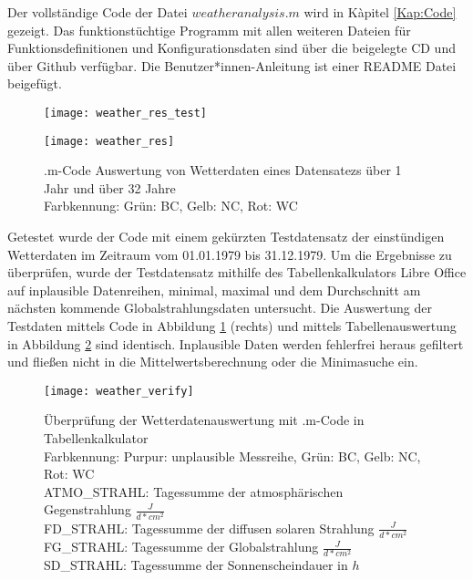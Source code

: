 Der vollständige Code der Datei $weatheranalysis.m$ wird in Kàpitel \ref{Kap:Code} gezeigt. Das funktionstüchtige Programm mit allen weiteren Dateien für Funktionsdefinitionen und Konfigurationsdaten sind über die beigelegte CD und über Github verfügbar. \cite{github_energyflowsim} Die Benutzer*innen-Anleitung ist einer README Datei beigefügt. \\

			\begin{figure}[h]
				\begin{minipage}{0.49\textwidth}
					\centering
					\texttt{[image: weather\_res\_test]}
				\end{minipage}\hfill
				\begin{minipage}{0.49\textwidth}
					\centering
					\texttt{[image: weather\_res]}
				\end{minipage}
				\caption{.m-Code Auswertung von Wetterdaten eines Datensatezs über 1 Jahr und über 32 Jahre \\ Farbkennung: Grün: BC, Gelb: NC, Rot: WC}
				\label{Abb:weather_res}
			\end{figure}

			Getestet wurde der Code mit einem gekürzten Testdatensatz der einstündigen Wetterdaten im Zeitraum vom 01.01.1979 bis 31.12.1979. Um die Ergebnisse zu überprüfen, wurde der Testdatensatz mithilfe des Tabellenkalkulators Libre Office auf inplausible Datenreihen, minimal, maximal und dem Durchschnitt am nächsten kommende Globalstrahlungsdaten untersucht. Die Auswertung der Testdaten mittels Code in Abbildung \ref{Abb:weather_res} (rechts) und mittels Tabellenauswertung in Abbildung \ref{Abb:weather_verify} sind identisch. Inplausible Daten werden fehlerfrei heraus gefiltert und fließen nicht in die Mittelwertsberechnung oder die Minimasuche ein. \\
						
			\begin{figure}[h]
				\centering
				\texttt{[image: weather\_verify]}
				\caption{
					Überprüfung der Wetterdatenauswertung mit .m-Code in Tabellenkalkulator \\ 
					Farbkennung: Purpur: unplausible Messreihe, Grün: BC, Gelb: NC, Rot: WC \\ 
					ATMO\_STRAHL: Tagessumme der atmosphärischen Gegenstrahlung $\frac{J}{d*cm^2}$\\
					FD\_STRAHL: Tagessumme der diffusen solaren Strahlung $\frac{J}{d*cm^2}$\\
					FG\_STRAHL: Tagessumme der Globalstrahlung $\frac{J}{d*cm^2}$\\
					SD\_STRAHL: Tagessumme der Sonnenscheindauer in $h$\\
				}
				\label{Abb:weather_verify}
			\end{figure}
			
